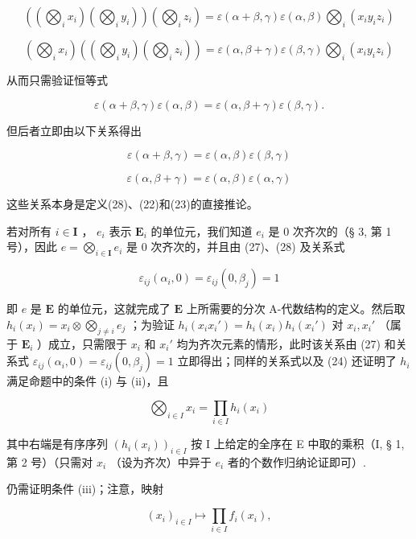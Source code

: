 \[
\left(\left(\bigotimes_ {i} x _ {i}\right) \left(\bigotimes_ {i} y _ {i}\right)\right) \left(\bigotimes_ {i} z _ {i}\right) = \varepsilon (\alpha + \beta , \gamma) \varepsilon (\alpha , \beta) \bigotimes_ {i} (x _ {i} y _ {i} z _ {i})
\]

\[
\left(\bigotimes_ {i} x _ {i}\right) \left(\left(\bigotimes_ {i} y _ {i}\right) \left(\bigotimes_ {i} z _ {i}\right)\right) = \varepsilon (\alpha , \beta + \gamma) \varepsilon (\beta , \gamma) \bigotimes_ {i} (x _ {i} y _ {i} z _ {i})
\]

从而只需验证恒等式

\[
\varepsilon (\alpha + \beta , \gamma) \varepsilon (\alpha , \beta) = \varepsilon (\alpha , \beta + \gamma) \varepsilon (\beta , \gamma).
\]

但后者立即由以下关系得出

\[
\varepsilon (\alpha + \beta , \gamma) = \varepsilon (\alpha , \beta) \varepsilon (\beta , \gamma)
\]

\[
\varepsilon (\alpha , \beta + \gamma) = \varepsilon (\alpha , \beta) \varepsilon (\alpha , \gamma)
\]

这些关系本身是定义(28)、(22)和(23)的直接推论。

若对所有 \(i \in \mathbf{I}\) ， \(e_i\) 表示 \(\mathbf{E}_i\) 的单位元，我们知道 \(e_i\) 是 0 次齐次的（§ 3, 第 1 号），因此 \(e = \bigotimes_{i \in \mathbf{I}} e_i\) 是 0 次齐次的，并且由 (27)、(28) 及关系式

\[
\varepsilon_ {i j} (\alpha_ {i}, 0) = \varepsilon_ {i j} (0, \beta_ {j}) = 1
\]

即 \(e\) 是 \(\mathbf{E}\) 的单位元，这就完成了 \(\mathbf{E}\) 上所需要的分次 A-代数结构的定义。然后取 \(h_i(x_i) = x_i \otimes \bigotimes_{j \neq i} e_j\) ；为验证 \(h_i(x_i x_i') = h_i(x_i) h_i(x_i')\) 对 \(x_i, x_i'\) （属于 \(\mathbf{E}_i\) ）成立，只需限于 \(x_i\) 和 \(x_i'\) 均为齐次元素的情形，此时该关系由 (27) 和关系式 \(\varepsilon_{ij}(\alpha_i, 0) = \varepsilon_{ij}(0, \beta_j) = 1\) 立即得出；同样的关系式以及 (24) 还证明了 \(h_i\) 满足命题中的条件 (i) 与 (ii)，且

\[
\bigotimes_ {i \in I} x _ {i} = \prod_ {i \in I} h _ {i} (x _ {i})\tag{29}
\]

其中右端是有序序列 \((h_i(x_i))_{i\in I}\) 按 I 上给定的全序在 E 中取的乘积（I, § 1, 第 2 号）（只需对 \(x_{i}\) （设为齐次）中异于 \(e_i\) 者的个数作归纳论证即可）.

仍需证明条件 (iii)；注意，映射

\[
(x _ {i}) _ {i \in I} \mapsto \prod_ {i \in I} f _ {i} (x _ {i}),
\]

